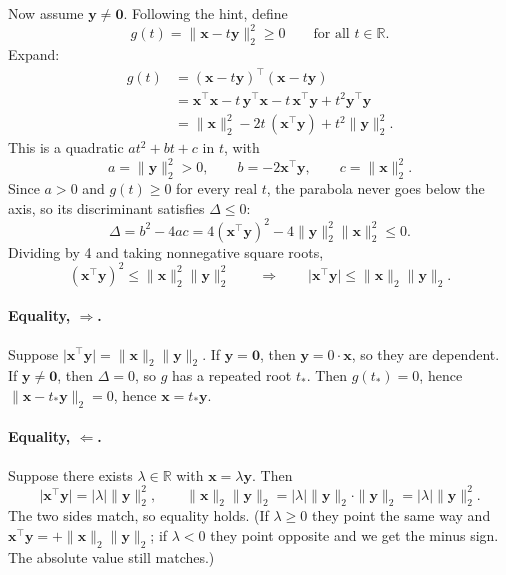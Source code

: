 \documentclass[11pt]{article}
\newcommand{\vct}[1]{\mathbf{#1}}
\begin{document}
Now assume \(\vct{y} \neq \vct{0}\). Following the hint, define
\[
g(t) = \|\vct{x} - t\vct{y}\|_2^2 \ge 0 \qquad \text{for all } t \in \mathbb{R}.
\]
Expand:
\begin{align*}
g(t)
&= (\vct{x} - t\vct{y})^\top (\vct{x} - t\vct{y}) \\
&= \vct{x}^\top \vct{x} - t\, \vct{y}^\top \vct{x} - t\, \vct{x}^\top \vct{y}
  + t^2 \vct{y}^\top \vct{y} \\
&= \|\vct{x}\|_2^2 - 2t\,(\vct{x}^\top \vct{y}) + t^2 \|\vct{y}\|_2^2.
\end{align*}
This is a quadratic \(at^2 + bt + c\) in \(t\), with
\[
a = \|\vct{y}\|_2^2 > 0,
\qquad
b = -2\vct{x}^\top \vct{y},
\qquad
c = \|\vct{x}\|_2^2.
\]
Since \(a > 0\) and \(g(t) \ge 0\) for every real \(t\), the parabola never
goes below the axis, so its discriminant satisfies \(\Delta \le 0\):
\[
\Delta = b^2 - 4ac
= 4(\vct{x}^\top \vct{y})^2 - 4\|\vct{y}\|_2^2 \|\vct{x}\|_2^2
\le 0.
\]
Dividing by 4 and taking nonnegative square roots,
\[
(\vct{x}^\top \vct{y})^2 \le \|\vct{x}\|_2^2 \|\vct{y}\|_2^2
\qquad \Rightarrow \qquad
\bigl|\vct{x}^\top \vct{y}\bigr| \le \|\vct{x}\|_2 \|\vct{y}\|_2.
\]

\paragraph{Equality, \(\Rightarrow\).}
Suppose \(\bigl|\vct{x}^\top \vct{y}\bigr| = \|\vct{x}\|_2 \|\vct{y}\|_2\).
If \(\vct{y} = \vct{0}\), then \(\vct{y} = 0 \cdot \vct{x}\), so they are
dependent. If \(\vct{y} \neq \vct{0}\), then \(\Delta = 0\), so \(g\) has a
repeated root \(t_*\). Then \(g(t_*) = 0\), hence
\(\|\vct{x} - t_*\vct{y}\|_2 = 0\), hence \(\vct{x} = t_* \vct{y}\).

\paragraph{Equality, \(\Leftarrow\).}
Suppose there exists \(\lambda \in \mathbb{R}\) with
\(\vct{x} = \lambda \vct{y}\). Then
\[
\bigl|\vct{x}^\top \vct{y}\bigr| = |\lambda| \|\vct{y}\|_2^2,
\qquad
\|\vct{x}\|_2 \|\vct{y}\|_2
= |\lambda| \|\vct{y}\|_2 \cdot \|\vct{y}\|_2
= |\lambda| \|\vct{y}\|_2^2.
\]
The two sides match, so equality holds. (If \(\lambda \ge 0\) they point the
same way and \(\vct{x}^\top \vct{y} = +\|\vct{x}\|_2\|\vct{y}\|_2\); if
\(\lambda < 0\) they point opposite and we get the minus sign. The absolute
value still matches.)

\end{document}
